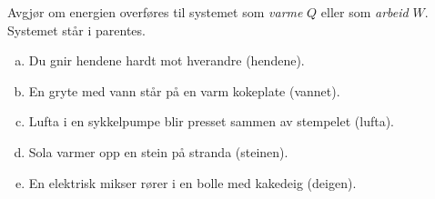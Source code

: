 %
Avgjør om energien overføres til systemet som \emph{varme} $Q$ eller som \emph{arbeid} $W$. Systemet står i parentes.
\begin{enumerate}[a)]
    \item Du gnir hendene hardt mot hverandre (hendene).
    \item En gryte med vann står på en varm kokeplate (vannet).
    \item Lufta i en sykkelpumpe blir presset sammen av stempelet (lufta).
    \item Sola varmer opp en stein på stranda (steinen).
    \item En elektrisk mikser rører i en bolle med kakedeig (deigen).
\end{enumerate}
%
